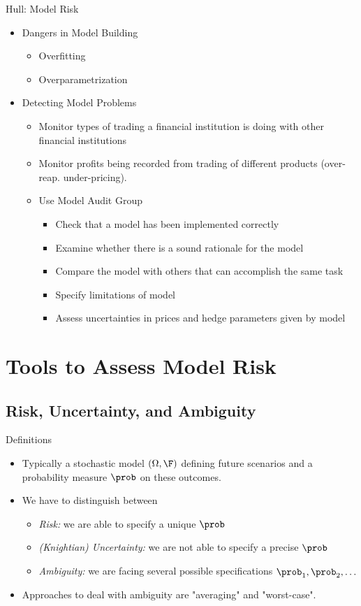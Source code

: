{Hull: Model Risk}
\begin{itemize}
\item<1->  Dangers in Model Building
\begin{itemize}
\item Overfitting
\item Overparametrization
\end{itemize}
\item<2-> Detecting Model Problems
\begin{itemize}
\item<1-> Monitor types of trading a financial institution is doing with other financial institutions
\item<2-> Monitor profits being recorded from trading of different products (over- reap. under-pricing).
\item<3-> Use Model Audit Group
\begin{itemize}
\item Check that a model has been implemented correctly
\item Examine whether there is a sound rationale for the model
\item Compare the model with others that can accomplish the same task
\item Specify limitations of model
\item Assess uncertainties in prices and hedge parameters given by model
\end{itemize}
\end{itemize}
\end{itemize}

\section{Tools to Assess Model Risk}
\subsection{Risk, Uncertainty, and Ambiguity}

{Definitions}
\begin{itemize}
\item<1-> Typically a stochastic model $(\Omega, \F)$ defining future scenarios and a
probability measure $\prob$ on these outcomes.
\item<2->  We have to distinguish between
\begin{itemize}
\item {\it Risk:}  we are able to specify a unique $\prob$
\item {\it (Knightian) Uncertainty:} we are not able to specify a precise $\prob$
\item {\it Ambiguity:}  we are facing several possible specifications $\prob_1, \prob_2, \ldots$\end{itemize}
\item<3-> Approaches to deal with ambiguity are "averaging" and "worst-case".
\end{itemize}

